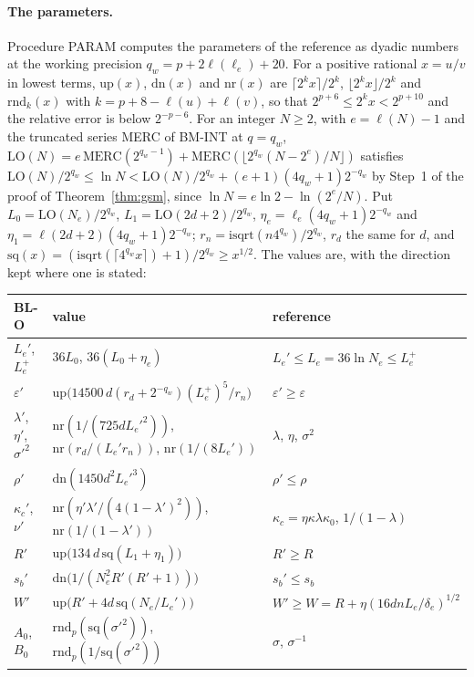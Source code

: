 \documentclass[11pt]{amsart}
\theoremstyle{definition}
\numberwithin{equation}{section}
\begin{document}
\paragraph{The parameters.} Procedure PARAM computes the parameters of the reference as dyadic numbers at the working precision $q_w=p+2\ell(\ell_e)+20$. For a positive rational $x=u/v$ in lowest terms, $\mathrm{up}(x)$, $\mathrm{dn}(x)$ and $\mathrm{nr}(x)$ are $\lceil2^kx\rceil/2^k$, $\lfloor2^kx\rfloor/2^k$ and $\mathrm{rnd}_k(x)$ with $k=p+8-\ell(u)+\ell(v)$, so that $2^{p+6}\le2^kx<2^{p+10}$ and the relative error is below $2^{-p-6}$. For an integer $N\ge2$, with $e=\ell(N)-1$ and the truncated series MERC of BM-INT at $q=q_w$, $\mathrm{LO}(N)=e\,\mathrm{MERC}(2^{q_w-1})+\mathrm{MERC}(\lfloor2^{q_w}(N-2^e)/N\rfloor)$ satisfies $\mathrm{LO}(N)/2^{q_w}\le\ln N<\mathrm{LO}(N)/2^{q_w}+(e+1)(4q_w+1)2^{-q_w}$ by Step~1 of the proof of Theorem~\ref{thm:gsm}, since $\ln N=e\ln2-\ln(2^e/N)$. Put $L_0=\mathrm{LO}(N_e)/2^{q_w}$, $L_1=\mathrm{LO}(2d+2)/2^{q_w}$, $\eta_e=\ell_e(4q_w+1)2^{-q_w}$ and $\eta_1=\ell(2d+2)(4q_w+1)2^{-q_w}$; $r_n=\mathrm{isqrt}(n4^{q_w})/2^{q_w}$, $r_d$ the same for $d$, and $\mathrm{sq}(x)=(\mathrm{isqrt}(\lceil4^{q_w}x\rceil)+1)/2^{q_w}\ge x^{1/2}$. The values are, with the direction kept where one is stated:
\begin{center}
\begin{tabular}{lll}
BL-O & value & reference\\\hline
$L_e'$, $L_e^+$ & $36L_0$, $36(L_0+\eta_e)$ & $L_e'\le L_e=36\ln N_e\le L_e^+$\\
$\varepsilon'$ & $\mathrm{up}\bigl(14500\,d(r_d+2^{-q_w})(L_e^+)^5/r_n\bigr)$ & $\varepsilon'\ge\varepsilon$\\
$\lambda'$, $\eta'$, $\sigma'^2$ & $\mathrm{nr}(1/(725dL_e'^2))$, $\mathrm{nr}(r_d/(L_e'r_n))$, $\mathrm{nr}(1/(8L_e'))$ & $\lambda$, $\eta$, $\sigma^2$\\
$\rho'$ & $\mathrm{dn}(1450d^2L_e'^3)$ & $\rho'\le\rho$\\
$\kappa_c'$, $\nu'$ & $\mathrm{nr}(\eta'\lambda'/(4(1-\lambda')^2))$, $\mathrm{nr}(1/(1-\lambda'))$ & $\kappa_c=\eta\kappa\lambda\kappa_0$, $1/(1-\lambda)$\\
$R'$ & $\mathrm{up}\bigl(134\,d\,\mathrm{sq}(L_1+\eta_1)\bigr)$ & $R'\ge R$\\
$s_b'$ & $\mathrm{dn}\bigl(1/(N_e^2R'(R'+1))\bigr)$ & $s_b'\le s_b$\\
$W'$ & $\mathrm{up}\bigl(R'+4d\,\mathrm{sq}(N_e/L_e')\bigr)$ & $W'\ge W=R+\eta(16dnL_e/\delta_e)^{1/2}$\\
$A_0$, $B_0$ & $\mathrm{rnd}_p(\mathrm{sq}(\sigma'^2))$, $\mathrm{rnd}_p(1/\mathrm{sq}(\sigma'^2))$ & $\sigma$, $\sigma^{-1}$
\end{tabular}
\end{center}
\end{document}
